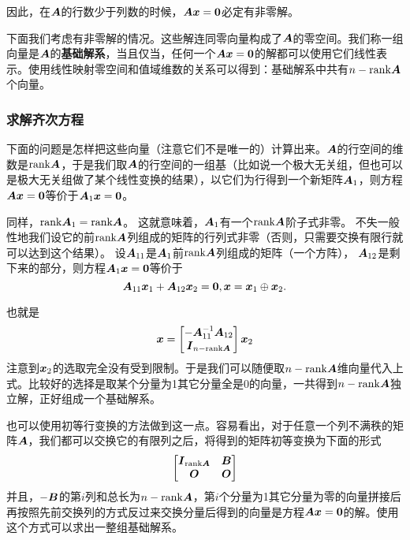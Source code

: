 \documentclass[UTF8]{ctexart}
\theoremstyle{definition}
\begin{document}
因此，在$\vb*{A}$的行数少于列数的时候，$\vb*{A} \vb*{x} = \vb*{0}$必定有非零解。

下面我们考虑有非零解的情况。这些解连同零向量构成了$\vb*{A}$的零空间。我们称一组向量是$\vb*{A}$的\textbf{基础解系}，当且仅当，任何一个$\vb*{A} \vb*{x} = \vb*{0}$的解都可以使用它们线性表示。使用线性映射零空间和值域维数的关系可以得到：基础解系中共有$n-\mathrm{rank}\vb*{A}$个向量。

\hypertarget{ux6c42ux89e3ux9f50ux6b21ux65b9ux7a0b}{%
\subsubsection{求解齐次方程}\label{ux6c42ux89e3ux9f50ux6b21ux65b9ux7a0b}}

下面的问题是怎样把这些向量（注意它们不是唯一的）计算出来。$\vb*{A}$的行空间的维数是$\mathrm{rank}\vb*{A}$，于是我们取$\vb*{A}$的行空间的一组基（比如说一个极大无关组，但也可以是极大无关组做了某个线性变换的结果），以它们为行得到一个新矩阵$\vb*{A}_1$，则方程$\vb*{A} \vb*{x} = \vb*{0}$等价于$\vb*{A}_1 \vb*{x} = \vb*{0}$。

同样，$\mathrm{rank}\vb*{A}_1=\mathrm{rank}\vb*{A}$。
这就意味着，$\vb*{A}_1$有一个$\mathrm{rank}\vb*{A}$阶子式非零。
不失一般性地我们设它的前$\mathrm{rank}\vb*{A}$列组成的矩阵的行列式非零（否则，只需要交换有限行就可以达到这个结果）。
设$\vb*{A}_{11}$是$\vb*{A}_1$前$\mathrm{rank}\vb*{A}$列组成的矩阵（一个方阵），
$\vb*{A}_{12}$是剩下来的部分，则方程$\vb*{A}_1 \vb*{x} = \vb*{0}$等价于
\[
\vb*{A}_{11} \vb*{x}_1 + \vb*{A}_{12} \vb*{x}_2 = \vb*{0}, \vb*{x} = \vb*{x}_1 \oplus \vb*{x}_2.
\]

也就是 \[
\vb*{x} = \left[
    \begin{matrix}
        - \vb*{A}_{11}^{-1} \vb*{A}_{12} \\
        \vb*{I}_{n-\mathrm{rank}\vb*{A}}
    \end{matrix}    
\right] \vb*{x}_2
\]
注意到$\vb*{x}_2$的选取完全没有受到限制。于是我们可以随便取$n-\mathrm{rank}\vb*{A}$维向量代入上式。比较好的选择是取某个分量为1其它分量全是0的向量，一共得到$n-\mathrm{rank}\vb*{A}$独立解，正好组成一个基础解系。

也可以使用初等行变换的方法做到这一点。容易看出，对于任意一个列不满秩的矩阵$\vb*{A}$，我们都可以交换它的有限列之后，将得到的矩阵初等变换为下面的形式
\[
\left[
    \begin{matrix}
        \vb*{I}_{\mathrm{rank}\vb*{A}} & \vb*{B} \\
        \vb*{O} & \vb*{O}
    \end{matrix}    
\right]
\]
并且，$-\vb*{B}$的第$i$列和总长为$n-\mathrm{rank}\vb*{A}$，第$i$个分量为1其它分量为零的向量拼接后再按照先前交换列的方式反过来交换分量后得到的向量是方程$\vb*{A} \vb*{x} = \vb*{0}$的解。使用这个方式可以求出一整组基础解系。
\end{document}
